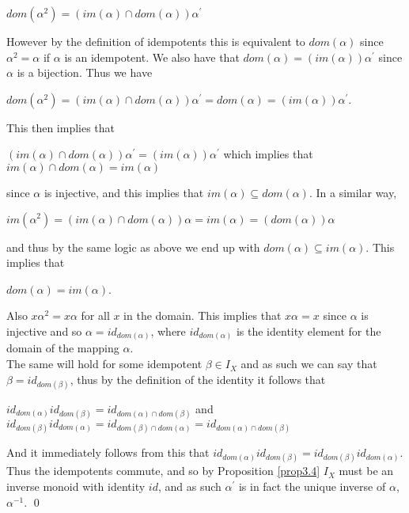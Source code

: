 \documentclass[12pt]{article}
\begin{document}
	\begin{center}
		$dom(\alpha^2)= (im(\alpha) \cap dom(\alpha))\alpha^\prime$
	\end{center}
	However by the definition of idempotents this is equivalent to $dom(\alpha)$ since $\alpha ^2 = \alpha$ if $\alpha$ is an idempotent. We also have that $dom(\alpha)=(im(\alpha))\alpha^\prime$ since $\alpha$ is a bijection. Thus we have
	\begin{center}
		$dom(\alpha^2) = (im(\alpha) \cap dom(\alpha))\alpha^\prime = dom(\alpha) = (im(\alpha))\alpha^\prime$.
	\end{center}
	This then implies that
	\begin{center}
		$(im(\alpha) \cap dom(\alpha))\alpha^\prime = (im(\alpha))\alpha^\prime$ \quad which implies that\\
		$im(\alpha) \cap dom(\alpha) = im(\alpha)$
	\end{center}
since $\alpha$ is injective, and this implies that $im(\alpha) \subseteq dom(\alpha)$. In a similar way,
	\begin{center}
		$im(\alpha^2)=(im(\alpha) \cap dom(\alpha))\alpha= im(\alpha) = (dom(\alpha))\alpha$
	\end{center}
and thus by the same logic as above we end up with $dom(\alpha) \subseteq im(\alpha)$. This implies that
	\begin{center}
		$dom(\alpha) = im(\alpha)$.
	\end{center}
Also $x\alpha^2 = x\alpha$ for all $x$ in the domain. This implies that $x\alpha = x$ since $\alpha$ is injective and so $\alpha=id_{dom(\alpha)}$, where $id_{dom(\alpha)}$ is the identity element for the domain of the mapping $\alpha$.\\
The same will hold for some idempotent $\beta \in I_X$ and as such we can say that $\beta = id_{dom(\beta)}$, thus by the definition of the identity it follows that
	\begin{center}
		$id_{dom(\alpha)}id_{dom(\beta)} = id_{dom(\alpha) \cap dom(\beta)}$ and\\ 
		$id_{dom(\beta)}id_{dom(\alpha)} = id_{dom(\beta) \cap dom(\alpha)}=id_{dom(\alpha) \cap dom(\beta)}$
	\end{center}
And it immediately follows from this that $id_{dom(\alpha)}id_{dom(\beta)} = id_{dom(\beta)}id_{dom(\alpha)}$. Thus the idempotents commute, and so by Proposition \ref{prop3.4} $I_X$ must be an inverse monoid with identity $id$, and as such $\alpha^\prime$ is in fact the unique inverse of $\alpha$, $\alpha^{-1}$.
\qed\\  
\end{document}
